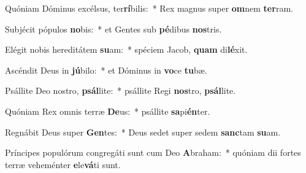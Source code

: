 \item Quóniam Dóminus excélsus, ter\textbf{rí}bilis:~* Rex magnus super \textbf{om}nem \textbf{ter}ram.
\item Subjécit pópulos \textbf{no}bis:~* et Gentes sub \textbf{pé}dibus \textbf{nos}tris.
\item Elégit nobis hereditátem \textbf{su}am:~* spéciem Jacob, \textbf{quam} di\textbf{lé}xit.
\item Ascéndit Deus in \textbf{jú}bilo:~* et Dóminus in \textbf{vo}ce \textbf{tu}bæ.
\item Psállite Deo nostro, \textbf{psál}lite:~* psállite Regi \textbf{nos}tro, \textbf{psál}lite.
\item Quóniam Rex omnis terræ \textbf{De}us:~* psállite \textbf{sa}pi\textbf{én}ter.
\item Regnábit Deus super \textbf{Gen}tes:~* Deus sedet super sedem \textbf{sanc}tam \textbf{su}am.
\item Príncipes populórum congregáti sunt cum Deo \textbf{A}braham:~* quóniam dii fortes terræ veheménter \textbf{e}le\textbf{vá}ti sunt.

